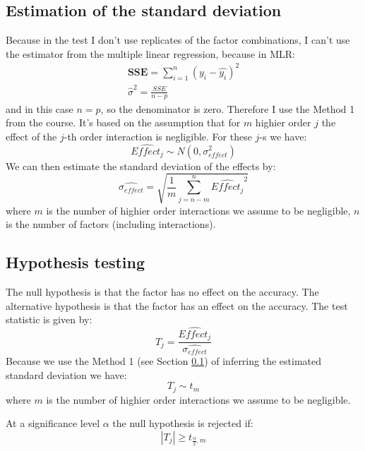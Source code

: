 \documentclass{article}
\begin{document}
\subsection{Estimation of the standard deviation}
\label{subsec:std_estim}

Because in the test I don't use replicates of the factor combinations, I can't use the estimator from the multiple linear regression, because in MLR:
\begin{align}
    \mathbf{SSE} = \sum_{i=1}^{n} \left(y_i - \hat{y_i} \right)^2 \\
    \hat{\sigma}^2 = \frac{SSE}{n-p}
\end{align}
and in this case $n=p$, so the denominator is zero. Therefore I use the Method 1 from the course. It's based on the assumption that for $m$ highier order $j$ the effect of the $j$-th order interaction is negligible. For these $j$-s we have:
\begin{equation}
    \widehat{Effect_j} \sim N(0, \sigma_{effect}^2)
\end{equation}
We can then estimate the standard deviation of the effects by:
\begin{equation}
    \widehat{\sigma_{effect}} = \sqrt{\frac{1}{m} \sum_{j=n-m}^{n} \widehat{Effect_j}^2}
\end{equation}
where $m$ is the number of highier order interactions we assume to be negligible, $n$ is the number of factors (including interactions).

\subsection{Hypothesis testing}
\label{subsec:hypothesis_testing}

The null hypothesis is that the factor has no effect on the accuracy. The alternative hypothesis is that the factor has an effect on the accuracy. The test statistic is given by:
\begin{equation}
    T_j = \frac{\widehat{Effect_j}}{\widehat{\sigma_{effect}}}
\end{equation}
Because we use the Method 1 (see Section \ref{subsec:std_estim}) of inferring the estimated standard deviation we have:
\begin{equation}
    T_j \sim t_{m}
\end{equation}
where $m$ is the number of highier order interactions we assume to be negligible.

At a significance level $\alpha$ the null hypothesis is rejected if:
\begin{equation}
    |T_j| \geq t_{\frac{\alpha}{2}, m}
\end{equation}
\end{document}
